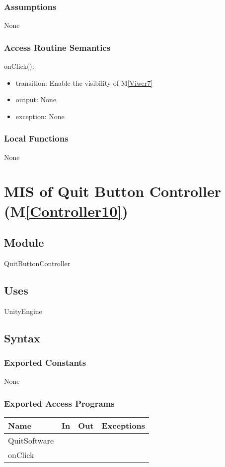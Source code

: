 \documentclass[12pt, titlepage]{article}
\newcommand{\mref}[1]{M\ref{#1}}
\begin{document}
\subsubsection{Assumptions}
None

\subsubsection{Access Routine Semantics}
onClick():
\begin{itemize}
    \item transition: Enable the visibility of  \mref{Viwer7}
    \item output: None
    \item exception: None
\end{itemize}
\subsubsection{Local Functions}
None
\newpage

\section{MIS of Quit Button Controller (\mref{Controller10})} 

\subsection{Module}
QuitButtonController
\subsection{Uses}
UnityEngine
\subsection{Syntax}

\subsubsection{Exported Constants}
None

\subsubsection{Exported Access Programs}
\begin{center}
\begin{tabular}{|p{3cm}|p{4cm}|p{4cm}| p{5cm}|}
\hline
\textbf{Name} & \textbf{In} & \textbf{Out} & \textbf{Exceptions} \\
\hline
 QuitSoftware & &  & \\
\hline
 onClick & &  & \\
\hline
\end{tabular}
\end{center}
\end{document}
